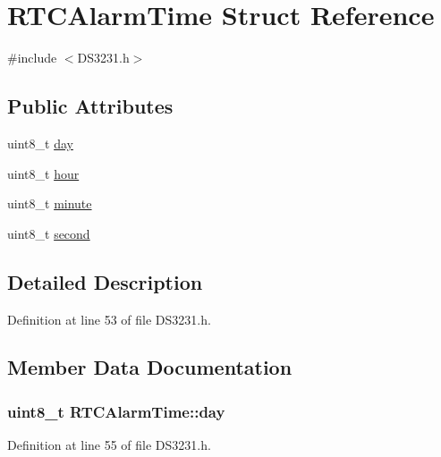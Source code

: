 \hypertarget{struct_r_t_c_alarm_time}{}\section{R\+T\+C\+Alarm\+Time Struct Reference}
\label{struct_r_t_c_alarm_time}


{\ttfamily \#include $<$D\+S3231.\+h$>$}

\subsection*{Public Attributes}
\begin{DoxyCompactItemize}
\item 
uint8\+\_\+t \hyperlink{struct_r_t_c_alarm_time_a16ff7f4abd3d771179c4662c942597aa}{day}
\item 
uint8\+\_\+t \hyperlink{struct_r_t_c_alarm_time_af80194d88cddcc273b97531f8b799138}{hour}
\item 
uint8\+\_\+t \hyperlink{struct_r_t_c_alarm_time_ae33cf5cda7523c05a3559485d2d26019}{minute}
\item 
uint8\+\_\+t \hyperlink{struct_r_t_c_alarm_time_a5367af27263fcbab3975c6c88b1be7bf}{second}
\end{DoxyCompactItemize}


\subsection{Detailed Description}


Definition at line 53 of file D\+S3231.\+h.



\subsection{Member Data Documentation}
\subsubsection[{\texorpdfstring{day}{day}}]{\setlength{\rightskip}{0pt plus 5cm}uint8\+\_\+t R\+T\+C\+Alarm\+Time\+::day}\hypertarget{struct_r_t_c_alarm_time_a16ff7f4abd3d771179c4662c942597aa}{}\label{struct_r_t_c_alarm_time_a16ff7f4abd3d771179c4662c942597aa}


Definition at line 55 of file D\+S3231.\+h.

